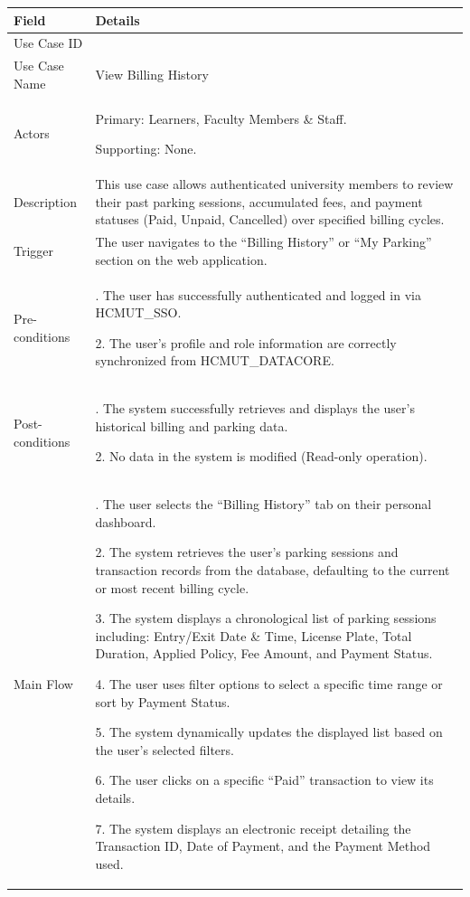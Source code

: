 \begin{table}[H]
\small
\renewcommand{\arraystretch}{1.4}
\begin{tabularx}{\textwidth}{|>{\raggedright\arraybackslash}p{3.5cm}|>{\RaggedRight\arraybackslash}X|}
\hline
\rowcolor{gray!20} \textbf{Field} & \textbf{Details} \\
\hline
Use Case ID & 3.4 \\
\hline
Use Case Name & View Billing History \\
\hline
Actors & Primary: Learners, Faculty Members \& Staff. \par Supporting: None. \\
\hline
Description & This use case allows authenticated university members to review their past parking sessions, accumulated fees, and payment statuses (Paid, Unpaid, Cancelled) over specified billing cycles. \\
\hline
Trigger & The user navigates to the ``Billing History'' or ``My Parking'' section on the web application. \\
\hline
Pre-conditions & 1. The user has successfully authenticated and logged in via HCMUT\_SSO. \par 2. The user's profile and role information are correctly synchronized from HCMUT\_DATACORE. \\
\hline
Post-conditions & 1. The system successfully retrieves and displays the user's historical billing and parking data. \par 2. No data in the system is modified (Read-only operation). \\
\hline
Main Flow & 
1. The user selects the ``Billing History'' tab on their personal dashboard. \par
2. The system retrieves the user's parking sessions and transaction records from the database, defaulting to the current or most recent billing cycle. \par
3. The system displays a chronological list of parking sessions including: Entry/Exit Date \& Time, License Plate, Total Duration, Applied Policy, Fee Amount, and Payment Status. \par
4. The user uses filter options to select a specific time range or sort by Payment Status. \par
5. The system dynamically updates the displayed list based on the user's selected filters. \par
6. The user clicks on a specific ``Paid'' transaction to view its details. \par
7. The system displays an electronic receipt detailing the Transaction ID, Date of Payment, and the Payment Method used. \\

\end{tabularx}
\end{table}
